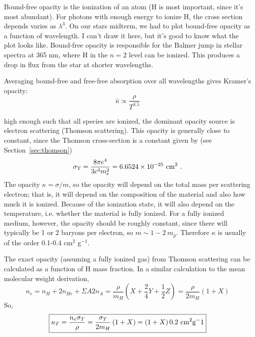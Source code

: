 \begin{enumerate}
      Bound-free opacity is the ionization of an atom (H is most important, since it's most 
      abundant).  For photons with enough energy to ionize H, the cross section depends varies 
      as $\lambda^3$.  On our stars midterm, we had to plot bound-free opacity as a function of 
      wavelength.  I can't draw it here, but it's good to know what the plot looks like.  
      Bound-free opacity is responsible for the Balmer jump in stellar spectra at 365 nm, where 
      H in the $n=2$ level can be ionized.  This produces a drop in flux from the star at shorter 
      wavelengths.

      Averaging bound-free and free-free absorption over all wavelengths gives Kramer's opacity:
      \begin{equation}\boxed{
      \bar{\kappa}\propto \frac{\rho}{T^{3.5}}
      }\end{equation}
       
       high enough such that all species are ionized,
      the dominant opacity source is electron scattering (Thomson scattering).
      This opacity is generally close to constant, since the Thomson cross-section is a constant given by
      (see Section~\ref{sec:thomson})
      \begin{equation}
      \sigma_{\rm T} = \frac{8 \pi e^4}{3 c^4 m_e^2} = 6.6524\times 10^{-25}~{\rm cm}^2\,\, .
      \end{equation}
      The opacity $\kappa = \sigma / m$, so the opacity will depend on the total mass per
      scattering electron; that is, it will depend on the composition of the material and also
      how much it is ionized. Because of the ionization state, it will also depend on the
      temperature, i.e. whether the material is fully ionized. For a fully ionized medium,
      however, the opacity should be roughly constant, since there will typically be 1 or 2
      baryons per electron, so $m \sim 1-2~m_p$. Therefore $\kappa$ is usually of the order
      0.1-0.4 cm$^2$ g$^{-1}$.

      The exact opacity (assuming a fully ionized gas) from Thomson scattering can be calculated 
      as a function of H mass fraction.  In a similar calculation to the mean molecular weight 
      derivation, 
      \begin{equation}
      n_e=n_H+2n_{He}+\Sigma{A}{2}n_A=\frac{\rho}{m_H}\left(X+\frac{2}{4}Y+\frac{1}{2}Z\right)=\frac{\rho}{2m_H}\left(1+X\right)
      \end{equation}
      So,
      \begin{equation}\boxed{
      \kappa_T=\frac{n_e\sigma_T}{\rho}=\frac{\sigma_T}{2m_H}\left(1+X\right)=\left(1+X\right)0.2~{\rm cm^2 g^-1}
      }\end{equation}
\end{enumerate}

